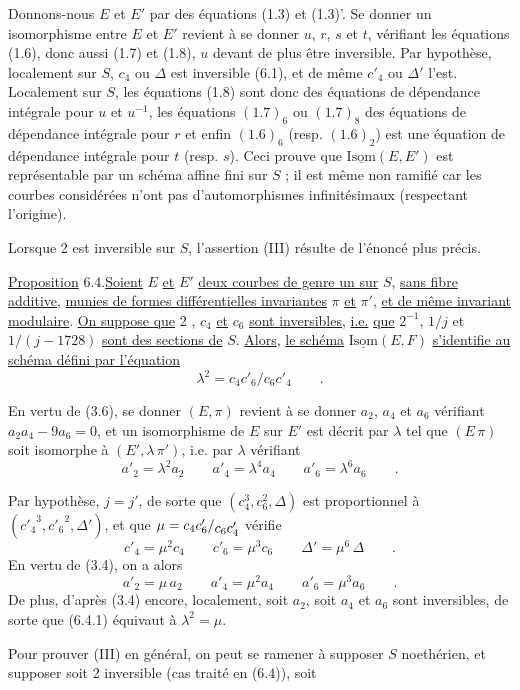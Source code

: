 Donnons-nous $E$ et $E'$ par des équations (1.3) et (1.3)'. Se donner un isomorphisme entre $E$ et $E'$ revient à se donner $u$, $r$, $s$ et $t$, vérifiant les équations (1.6), donc aussi (1.7) et (1.8), $u$ devant de plus être inversible. Par hypothèse, localement sur $S$, $c_4$ ou $\Delta$ est inversible (6.1), et de même $c'_4$ ou $\Delta'$ l'est. Localement sur $S$, les équations (1.8) sont donc des équations de dépendance intégrale pour $u$ et $u^{-1}$, les équations $(1.7)_6$ ou $(1.7)_8$ des équations de dépendance intégrale pour $r$ et enfin $(1.6)_6$ (resp. $(1.6)_2$) est une équation de dépendance intégrale pour $t$ (resp. $s$). Ceci prouve que $\underline{\mathrm{Isom}}(E,E')$ est représentable par un schéma affine fini sur $S$ ; il est même non ramifié car les courbes considérées n'ont pas d'automorphismes infinitésimaux (respectant l'origine).

Lorsque 2 est inversible sur $S$, l'assertion (III) résulte de l'énoncé plus précis.

\uline{Proposition} 6.4.\qquad \uline{Soient} $E$ \uline{et} $E'$ \uline{deux courbes de genre un sur} $S$,
\uline{sans fibre additive}, \uline{munies de formes différentielles invariantes} $\pi$ \uline{et} $\pi'$, \uline{et de même invariant modulaire}. \uline{On suppose que} 2 , $c_4$ \uline{et} $c_6$ \uline{sont inversibles}, \uline{i.e.} \uline{que} $2^{-1}$, $1/j$ et $1/(j-1728)$ \uline{sont des sections de} $S$. \uline{Alors}, \uline{le schéma} $\underline{\mathrm{Isom}}(E,F)$ \uline{s'identifie au schéma défini par l'équation}
\[
\lambda^2=c_4c'_6/c_6c'_4\qquad .
\]

En vertu de (3.6), se donner $(E,\pi)$ revient à se donner $a_2$, $a_4$ et $a_6$ vérifiant $a_2a_4-9a_6=0$, et un isomorphisme de $E$ sur $E'$ est décrit par $\lambda$ tel que $(E\,\pi)$ soit isomorphe à $(E',\lambda\,\pi')$, i.e. par $\lambda$ vérifiant
\[
a'_2=\lambda^2a_2\qquad a'_4=\lambda^4a_4\qquad a'_6=\lambda^6a_6\qquad .\tag*{(6.4.1)}
\]

Par hypothèse, $j=j'$, de sorte que $(c_4^3,c_6^2,\Delta)$ est proportionnel à $({c'_4}^3,{c'_6}^2,\Delta')$, et que $\mu=c_4c'_6/\raisebox{-.45ex}{$c_6c'_4$}$ vérifie
\[
c'_4=\mu^2c_4\qquad c'_6=\mu^3c_6\qquad \Delta'=\mu^6\,\Delta\qquad .\tag*{(6.4.2)}
\]
En vertu de (3.4), on a alors\margin{\handwritten{\unsure{--}}}
\[
a'_2=\mu\,a_2\qquad a'_4=\mu^2a_4\qquad a'_6=\mu^3a_6\qquad .
\]
De plus, d'après (3.4) encore, localement, soit $a_2$, soit $a_4$ et $a_6$ sont inversibles, de sorte que (6.4.1) équivaut à $\lambda^2=\mu$.

Pour prouver (III) en général, on peut se ramener à supposer $S$ noethérien, et supposer soit 2 inversible (cas traité en (6.4)), soit
